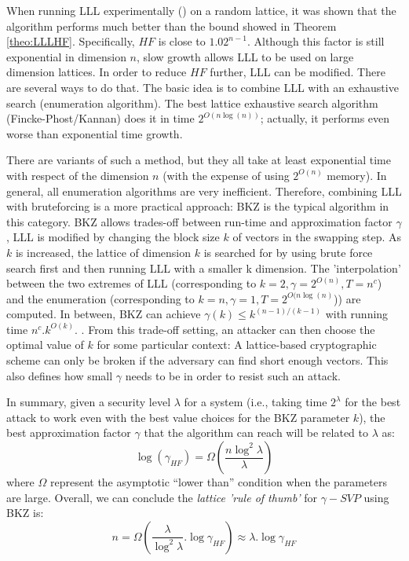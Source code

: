 When running LLL experimentally (\cite{nguyen2006lll}) on a random lattice, it
was shown that the algorithm performs much better than the bound showed in
Theorem \ref{theo:LLLHF}. Specifically, $HF$ is close to $1.02^{n-1}$. Although
this factor is still exponential in dimension $n$, slow growth allows LLL to be
used on large dimension lattices. In order to reduce $HF$ further, LLL can be
modified. There are several ways to do that. The basic idea is to combine LLL
with an exhaustive search (enumeration algorithm). The best lattice exhaustive
search algorithm (Fincke-Phost/Kannan) does it in time $2^{O(n\log(n))}$;
actually, it performs even worse than exponential time growth.

There are variants of such a method, but they all take at least
exponential time with respect of the dimension $n$ (with the expense of using $2^{O(n)}$
memory). In general, all enumeration algorithms are very inefficient. Therefore,
combining LLL with bruteforcing is a more practical approach: BKZ is the typical
algorithm in this category.  BKZ allows trades-off between run-time and
approximation factor $\gamma$, LLL is modified by changing the block size $k$ of
vectors in the swapping step. As $k$ is increased, the lattice of
dimension $k$ is searched for by using brute force search first and then running LLL with a smaller k dimension. The 'interpolation' between the two extremes of LLL (corresponding to
$k = 2, \gamma = 2^{O(n)}, T = n^c$) and the enumeration (corresponding to
$k = n, \gamma=1, T = 2^{O(n\log(n)}$)) are computed. In between, BKZ can achieve
$\gamma(k) \leq k^{(n-1)/(k-1)}$ with running time
$n^c.k^{O(k)}$. \cite{hanrot2011terminating}. From this trade-off setting, an
attacker can then choose the optimal value of $k$ for some particular context: A
lattice-based cryptographic scheme can only be broken if the adversary can find
short enough vectors. This also defines how small $\gamma$ needs to be in order
to resist such an attack.

In summary, given a security level $\lambda$ for a system (i.e., taking
time $2^\lambda$ for the best attack to work even with the best value choices for the BKZ
parameter $k$), the best approximation factor $\gamma$ that the
algorithm can reach will be related to $\lambda$ as:
\[
  \log(\gamma_{HF}) = \Omega(\frac{n\log^2\lambda}{\lambda})
\]
where $\Omega$ represent the asymptotic ``lower than'' condition when the parameters
are large. Overall, we can conclude the \emph{lattice 'rule of thumb'} for
$\gamma-SVP$ using BKZ is:
\[
  n = \Omega(\frac{\lambda}{\log^2\lambda}.\log\gamma_{HF}) \approx \lambda
  . \log\gamma_{HF}
\]

